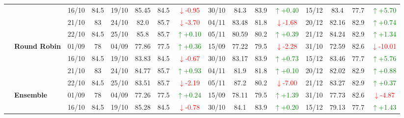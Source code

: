 {\begin{longtable}{llcc|cccc|cccc|cccc}
&
& 16/10 & 84.5 & 19/10 & 85.45 & 84.5 & \textcolor{red}{\(\downarrow\)-0.95} & 30/10 & 84.3 & 83.9 & \textcolor{green}{\(\uparrow\)+0.40} & 15/12 & 83.4 & 77.7 & \textcolor{green}{\(\uparrow\)+5.70} \\

&
& 21/10 & 83 & 24/10 & 82.0 & 85.7 & \textcolor{red}{\(\downarrow\)-3.70} & 04/11 & 83.48 & 81.8 & \textcolor{red}{\(\downarrow\)-1.68} & 20/12 & 82.16 & 82.9 & \textcolor{green}{\(\uparrow\)+0.74} \\

&
& 22/10 & 84.5 & 25/10 & 85.8 & 85.7 & \textcolor{green}{\(\uparrow\)+0.10} & 05/11 & 80.59 & 80.2 & \textcolor{green}{\(\uparrow\)+0.39} & 21/12 & 84.24 & 82.9 & \textcolor{green}{\(\uparrow\)+1.34} \\
\cmidrule(lr){2-16}


& \textbf{Round Robin}
& 01/09 & 78 & 04/09 & 77.86 & 77.5 & \textcolor{green}{\(\uparrow\)+0.36} & 15/09 & 77.22 & 79.5 & \textcolor{red}{\(\downarrow\)-2.28} & 31/10 & 72.59 & 82.6 & \textcolor{red}{\(\downarrow\)-10.01} \\

&
& 16/10 & 84.5 & 19/10 & 83.83 & 84.5 & \textcolor{red}{\(\downarrow\)-0.67} & 30/10 & 83.17 & 83.9 & \textcolor{green}{\(\uparrow\)+0.73} & 15/12 & 83.46 & 77.7 & \textcolor{green}{\(\uparrow\)+5.76} \\

&
& 21/10 & 83 & 24/10 & 84.77 & 85.7 & \textcolor{green}{\(\uparrow\)+0.93} & 04/11 & 81.9 & 81.8 & \textcolor{green}{\(\uparrow\)+0.10} & 20/12 & 82.02 & 82.9 & \textcolor{green}{\(\uparrow\)+0.88} \\

&
& 22/10 & 84.5 & 25/10 & 83.51 & 85.7 & \textcolor{red}{\(\downarrow\)-2.19} & 05/11 & 87.2 & 80.2 & \textcolor{red}{\(\downarrow\)-7.00} & 21/12 & 83.27 & 82.9 & \textcolor{green}{\(\uparrow\)+0.37} \\
\cmidrule(lr){2-16}




& \textbf{Ensemble}
& 01/09 & 78 & 04/09 & 77.26 & 77.5 & \textcolor{green}{\(\uparrow\)+0.24} & 15/09 & 78.11 & 79.5 & \textcolor{green}{\(\uparrow\)+1.39} & 31/10 & 77.73 & 82.6 & \textcolor{red}{\(\downarrow\)-4.87} \\

&
& 16/10 & 84.5 & 19/10 & 85.28 & 84.5 & \textcolor{red}{\(\downarrow\)-0.78} & 30/10 & 84.1 & 83.9 & \textcolor{green}{\(\uparrow\)+0.20} & 15/12 & 79.13 & 77.7 & \textcolor{green}{\(\uparrow\)+1.43} \\


\end{longtable}}
